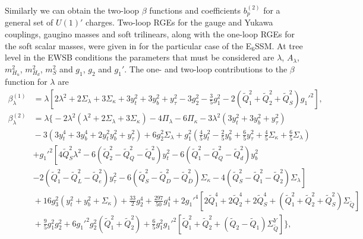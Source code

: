 \documentclass[preprint,amsmath,amssymb,aps,superscriptaddress,prd,showpacs,floatfix,nofootinbib]{revtex4-1}
\begin{document}
Similarly we can obtain the two-loop $\beta$ functions and
coefficients $b_p^{(2)}$ for a general set of $U(1)'$
charges. Two-loop RGEs for the gauge and Yukawa couplings, gaugino
masses and soft trilinears, along with the one-loop RGEs for the soft
scalar masses, were given in \cite{Athron:2009bs} for the particular
case of the E$_6$SSM. At tree level in the EWSB conditions the
parameters that must be considered are $\lambda$, $A_\lambda$,
$m_{H_u}^2$, $m_{H_d}^2$, $m_S^2$ and $g_1$, $g_2$ and $g_1'$. The
one- and two-loop contributions to the $\beta$ function for $\lambda$
are
\begin{subequations}\label{eq:USSMLambdaBetas}
\begin{align}
\beta_\lambda^{(1)}&=\lambda  \left[2\lambda ^2+2 \Sigma_\lambda +3 \Sigma_\kappa +3 y_t^2+3 y_b^2+y_{\tau }^2-3 g_2^2-\frac{3}{5} g_1^2 -2 \left ( \tilde{Q}_1^2 + \tilde{Q}_2^2 + \tilde{Q}_S^2\right )g_1'^2 \right],\label{eq:USSMLambdaBetaOneLoop}\\
\beta_\lambda^{(2)}&=\lambda \bigg \{ -2\lambda^2\left ( \lambda^2+2\Sigma_\lambda+3\Sigma_\kappa\right )-4\Pi_\lambda-6\Pi_\kappa-3\lambda^2\left ( 3y_t^2+3y_b^2+y_\tau^2\right ) \nonumber\\
&{} -3\left ( 3y_t^4+3y_b^4+2y_t^2y_b^2+y_\tau^2 \right )+6g_2^2\Sigma_\lambda+g_1^2\left ( \frac{4}{5}y_t^2-\frac{2}{5}y_b^2+\frac{6}{5}y_\tau^2+\frac{4}{5}\Sigma_\kappa +\frac{6}{5}\Sigma_\lambda\right )\nonumber\\
&{}\left.+g_1'^2\left [ 4\tilde{Q}_S^2\lambda^2 -6\left ( \tilde{Q}_2^2-\tilde{Q}_Q^2-\tilde{Q}_u^2\right )y_t^2-6\left ( \tilde{Q}_1^2-\tilde{Q}_Q^2-\tilde{Q}_d^2\right )y_b^2 \right.\right.\nonumber\\
&{}\left.-2\left ( \tilde{Q}_1^2-\tilde{Q}_L^2-\tilde{Q}_e^2\right )y_\tau^2-6\left ( \tilde{Q}_S^2-\tilde{Q}_D^2-\tilde{Q}_{\overline{D}}^2 \right )\Sigma_\kappa-4\left ( \tilde{Q}_S^2-\tilde{Q}_1^2-\tilde{Q}_2^2\right )\Sigma_\lambda\right ]\nonumber\\
&{}+16g_3^2\left ( y_t^2+y_b^2+\Sigma_\kappa\right ) +\frac{33}{2}g_2^4+\frac{297}{50}g_1^4+2g_1'^4\left [ 2\tilde{Q}_1^4+2\tilde{Q}_2^4+2\tilde{Q}_S^4+\left ( \tilde{Q}_1^2+\tilde{Q}_2^2+\tilde{Q}_S^2\right )\Sigma_{\tilde{Q}}\right ]\nonumber\\
&{}+\frac{9}{5}g_1^2g_2^2+6g_1'^2g_2^2\left ( \tilde{Q}_1^2+\tilde{Q}_2^2\right )+\frac{6}{5}g_1^2g_1'^2\left [\tilde{Q}_1^2+\tilde{Q}_2^2+\left ( \tilde{Q}_2-\tilde{Q}_1\right )\Sigma_{\tilde{Q}}^Y\right ]\bigg \},\label{eq:USSMLambdaBetaTwoLoop}
\end{align}
\end{subequations}
\end{document}
